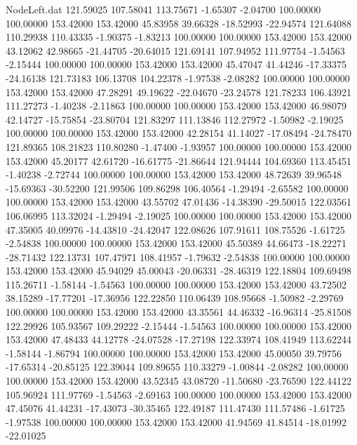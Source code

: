 \begin{filecontents}{NodeLeft.dat}
 121.59025  107.58041  113.75671    -1.65307   -2.04700  100.00000  100.00000  153.42000  153.42000   45.83958   39.66328  -18.52993  -22.94574
 121.64088  110.29938  110.43335    -1.90375   -1.83213  100.00000  100.00000  153.42000  153.42000   43.12062   42.98665  -21.44705  -20.64015
 121.69141  107.94952  111.97754    -1.54563   -2.15444  100.00000  100.00000  153.42000  153.42000   45.47047   41.44246  -17.33375  -24.16138
 121.73183  106.13708  104.22378    -1.97538   -2.08282  100.00000  100.00000  153.42000  153.42000   47.28291   49.19622  -22.04670  -23.24578
 121.78233  106.43921  111.27273    -1.40238   -2.11863  100.00000  100.00000  153.42000  153.42000   46.98079   42.14727  -15.75854  -23.80704
 121.83297  111.13846  112.27972    -1.50982   -2.19025  100.00000  100.00000  153.42000  153.42000   42.28154   41.14027  -17.08494  -24.78470
 121.89365  108.21823  110.80280    -1.47400   -1.93957  100.00000  100.00000  153.42000  153.42000   45.20177   42.61720  -16.61775  -21.86644
 121.94444  104.69360  113.45451    -1.40238   -2.72744  100.00000  100.00000  153.42000  153.42000   48.72639   39.96548  -15.69363  -30.52200
 121.99506  109.86298  106.40564    -1.29494   -2.65582  100.00000  100.00000  153.42000  153.42000   43.55702   47.01436  -14.38390  -29.50015
 122.03561  106.06995  113.32024    -1.29494   -2.19025  100.00000  100.00000  153.42000  153.42000   47.35005   40.09976  -14.43810  -24.42047
 122.08626  107.91611  108.75526    -1.61725   -2.54838  100.00000  100.00000  153.42000  153.42000   45.50389   44.66473  -18.22271  -28.71432
 122.13731  107.47971  108.41957    -1.79632   -2.54838  100.00000  100.00000  153.42000  153.42000   45.94029   45.00043  -20.06331  -28.46319
 122.18804  109.69498  115.26711    -1.58144   -1.54563  100.00000  100.00000  153.42000  153.42000   43.72502   38.15289  -17.77201  -17.36956
 122.22850  110.06439  108.95668    -1.50982   -2.29769  100.00000  100.00000  153.42000  153.42000   43.35561   44.46332  -16.96314  -25.81508
 122.29926  105.93567  109.29222    -2.15444   -1.54563  100.00000  100.00000  153.42000  153.42000   47.48433   44.12778  -24.07528  -17.27198
 122.33974  108.41949  113.62244    -1.58144   -1.86794  100.00000  100.00000  153.42000  153.42000   45.00050   39.79756  -17.65314  -20.85125
 122.39044  109.89655  110.33279    -1.00844   -2.08282  100.00000  100.00000  153.42000  153.42000   43.52345   43.08720  -11.50680  -23.76590
 122.44122  105.96924  111.97769    -1.54563   -2.69163  100.00000  100.00000  153.42000  153.42000   47.45076   41.44231  -17.43073  -30.35465
 122.49187  111.47430  111.57486    -1.61725   -1.97538  100.00000  100.00000  153.42000  153.42000   41.94569   41.84514  -18.01992  -22.01025

\end{filecontents}

